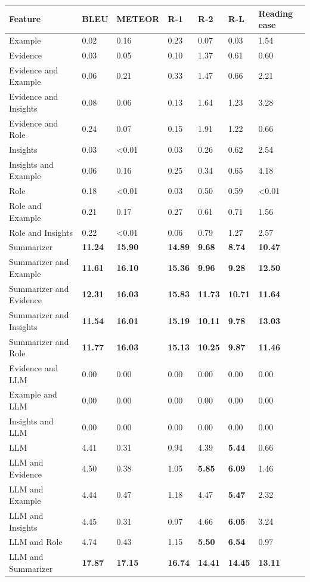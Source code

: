 \begin{tabular}{|l|l|l|l|l|l|l|}
\hline
\textbf{Feature} & BLEU & METEOR & R-1 & R-2 & R-L & Reading ease \\
 \hline
 Example & 0.02 & 0.16 & 0.23 & 0.07 & 0.03 & 1.54 \\
 \hline
 Evidence & 0.03 & 0.05 & 0.10 & 1.37 & 0.61 & 0.60 \\
 \hline
 Evidence and Example & 0.06 & 0.21 & 0.33 & 1.47 & 0.66 & 2.21 \\
 \hline
 Evidence and Insights & 0.08 & 0.06 & 0.13 & 1.64 & 1.23 & 3.28 \\
 \hline
 Evidence and Role & 0.24 & 0.07 & 0.15 & 1.91 & 1.22 & 0.66 \\
 \hline
 Insights & 0.03 & \textless{}0.01 & 0.03 & 0.26 & 0.62 & 2.54 \\
 \hline
 Insights and Example & 0.06 & 0.16 & 0.25 & 0.34 & 0.65 & 4.18 \\
 \hline
 Role & 0.18 & \textless{}0.01 & 0.03 & 0.50 & 0.59 & \textless{}0.01 \\
 \hline
 Role and Example & 0.21 & 0.17 & 0.27 & 0.61 & 0.71 & 1.56 \\
 \hline
 Role and Insights & 0.22 & \textless{}0.01 & 0.06 & 0.79 & 1.27 & 2.57 \\
 \hline
 Summarizer & \textbf{11.24} & \textbf{15.90} & \textbf{14.89} & \textbf{9.68} & \textbf{8.74} & \textbf{10.47} \\
 \hline
 Summarizer and Example & \textbf{11.61} & \textbf{16.10} & \textbf{15.36} & \textbf{9.96} & \textbf{9.28} & \textbf{12.50} \\
 \hline
 Summarizer and Evidence & \textbf{12.31} & \textbf{16.03} & \textbf{15.83} & \textbf{11.73} & \textbf{10.71} & \textbf{11.64} \\
 \hline
 Summarizer and Insights & \textbf{11.54} & \textbf{16.01} & \textbf{15.19} & \textbf{10.11} & \textbf{9.78} & \textbf{13.03} \\
 \hline
 Summarizer and Role & \textbf{11.77} & \textbf{16.03} & \textbf{15.13} & \textbf{10.25} & \textbf{9.87} & \textbf{11.46} \\
 \hline
 Evidence and LLM & 0.00 & 0.00 & 0.00 & 0.00 & 0.00 & 0.00 \\
 \hline
 Example and LLM & 0.00 & 0.00 & 0.00 & 0.00 & 0.00 & 0.00 \\
 \hline
 Insights and LLM & 0.00 & 0.00 & 0.00 & 0.00 & 0.00 & 0.00 \\
 \hline
 LLM & 4.41 & 0.31 & 0.94 & 4.39 & \textbf{5.44} & 0.66 \\
 \hline
 LLM and Evidence & 4.50 & 0.38 & 1.05 & \textbf{5.85} & \textbf{6.09} & 1.46 \\
 \hline
 LLM and Example & 4.44 & 0.47 & 1.18 & 4.47 & \textbf{5.47} & 2.32 \\
 \hline
 LLM and Insights & 4.45 & 0.31 & 0.97 & 4.66 & \textbf{6.05} & 3.24 \\
 \hline
 LLM and Role & 4.74 & 0.43 & 1.15 & \textbf{5.50} & \textbf{6.54} & 0.97 \\
 \hline
 LLM and Summarizer & \textbf{17.87} & \textbf{17.15} & \textbf{16.74} & \textbf{14.41} & \textbf{14.45} & \textbf{13.11} \\
\hline
\end{tabular}

